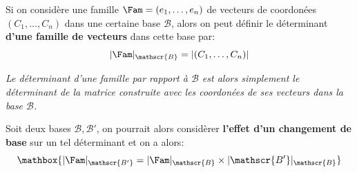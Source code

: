 Si on considère une famille \(\Fam = (e_1 , \ldots, e_n)\) de vecteurs de coordonées \((C_1, \ldots, C_n)\) dans une certaine base \(\mathscr{B}\), alors on peut définir le déterminant \textbf{d'une famille de vecteurs} dans cette base par:
\[
   |\Fam|_{\mathscr{B}} = |(C_1, \ldots, C_n)|
\]
\begin{center}
   \textit{Le déterminant d'une famille par rapport à \(\mathscr{B}\) est alors simplement le déterminant de la matrice construite avec les coordonées de ses vecteurs dans la base \(\mathscr{B}\).}
\end{center}

Soit deux bases \(\mathscr{B, B'}\), on pourrait alors considèrer \textbf{l'effet d'un changement de base} sur un tel déterminant et on a alors:
\[
   \mathbox{
      |\Fam|_{\mathscr{B'}} = |\Fam|_{\mathscr{B}} \times |\mathscr{B'}|_{\mathscr{B}}
   }
\]

\subsection*{}

